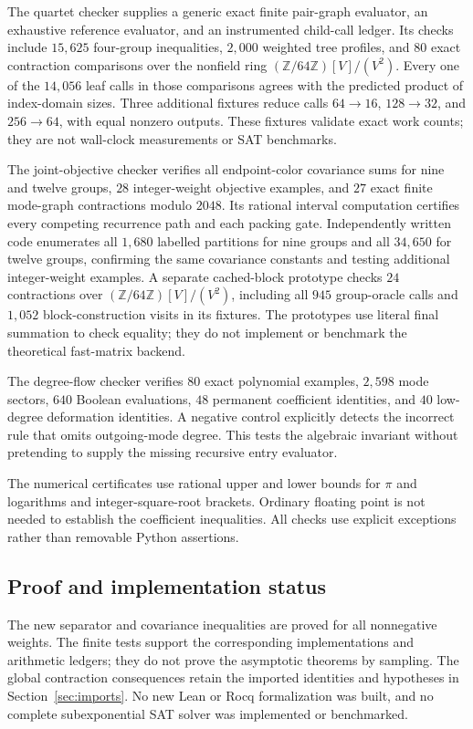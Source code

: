 The quartet checker supplies a generic exact finite pair-graph evaluator,
an exhaustive reference evaluator, and an instrumented child-call ledger.
Its checks include $15{,}625$ four-group inequalities, $2{,}000$ weighted
tree profiles, and $80$ exact contraction comparisons over the nonfield
ring $(\mathbb Z/64\mathbb Z)[V]/(V^2)$. Every one of the $14{,}056$
leaf calls in those comparisons agrees with the predicted product of
index-domain sizes. Three additional fixtures reduce calls
$64\to16$, $128\to32$, and $256\to64$, with equal nonzero outputs.
These fixtures validate exact work counts; they are not wall-clock
measurements or SAT benchmarks.

The joint-objective checker verifies all endpoint-color covariance sums
for nine and twelve groups, $28$ integer-weight objective examples, and
$27$ exact finite mode-graph contractions modulo $2048$. Its rational
interval computation certifies every competing recurrence path and each
packing gate. Independently written code enumerates all $1{,}680$ labelled
partitions for nine groups and all $34{,}650$ for twelve groups, confirming
the same covariance constants and testing additional integer-weight examples.
A separate cached-block prototype checks $24$ contractions over
$(\mathbb Z/64\mathbb Z)[V]/(V^2)$, including all $945$ group-oracle
calls and $1{,}052$ block-construction visits in its fixtures.
The prototypes use literal final summation to check equality; they do not
implement or benchmark the theoretical fast-matrix backend.

The degree-flow checker verifies $80$ exact polynomial examples,
$2{,}598$ mode sectors, $640$ Boolean evaluations, $48$ permanent
coefficient identities, and $40$ low-degree deformation identities.
A negative control explicitly detects the incorrect rule that omits
outgoing-mode degree. This tests the algebraic invariant without
pretending to supply the missing recursive entry evaluator.

The numerical certificates use rational upper and lower bounds for
$\pi$ and logarithms and integer-square-root brackets. Ordinary floating
point is not needed to establish the coefficient inequalities. All
checks use explicit exceptions rather than removable Python assertions.

\subsection{Proof and implementation status}

The new separator and covariance inequalities are proved for all
nonnegative weights. The finite tests support the corresponding
implementations and arithmetic ledgers; they do not prove the
asymptotic theorems by sampling. The global contraction consequences
retain the imported identities and hypotheses in Section~\ref{sec:imports}.
No new Lean or Rocq formalization was built, and no complete
subexponential SAT solver was implemented or benchmarked.

